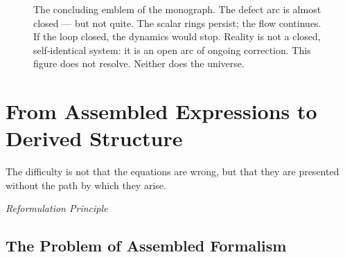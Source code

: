\documentclass[12pt,a4paper,openany]{book}
\theoremstyle{plain}
\theoremstyle{definition}
\theoremstyle{remark}
\begin{document}
\begin{figure}[h]
\centering
{}
\caption[The unfinished loop, Conclusion]{The concluding emblem of the monograph. The defect arc is almost closed --- but not quite. The scalar rings persist; the flow continues. If the loop closed, the dynamics would stop. Reality is not a closed, self-identical system: it is an open arc of ongoing correction. This figure does not resolve. Neither does the universe.}
\label{fig:glyph_open_loop}
\end{figure}



\chapter{From Assembled Expressions to Derived Structure}
\label{chap:assembled_vs_derived}

\epigraph{%
  The difficulty is not that the equations are wrong,
  but that they are presented without the path by which they arise.
}{%
  \textit{Reformulation Principle}}

\section{The Problem of Assembled Formalism}
\end{document}

